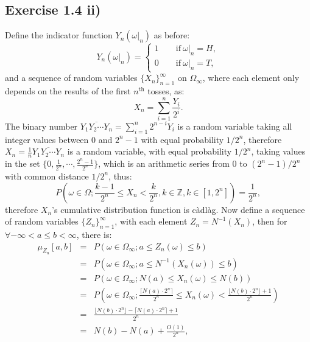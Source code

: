 \documentclass[final,3p,authoryear]{elsarticle}
\begin{document}
	\subsection{Exercise 1.4 ii)}
		Define the indicator function $Y_n(\omega|_n)$ as before:
		\begin{equation}
			Y_n(\omega|_n)=
			\begin{cases}
				1\qquad \mathrm{if~} \omega|_n=H,\\
				0\qquad \mathrm{if~} \omega|_n=T,
			\end{cases}
		\end{equation}
		and a sequence of random variables $\{X_n\}_{n=1}^{\infty}$ on $\Omega_\infty$, where each element only depends on the results of the first $n^\mathrm{th}$ tosses, as:
		\begin{equation}
			X_n=\sum\limits_{i=1}^{n} \frac{Y_i}{2^i}
			.
		\end{equation}
		The binary number $\overline{Y_1 Y_2 \cdots Y_n}=\sum\limits_{i=1}^{n} 2^{n-i} Y_i$ is a random variable taking all integer values between $0$ and $2^n-1$ with equal probability $1/2^n$, therefore $X_n=\frac{1}{n} \overline{Y_1 Y_2 \cdots Y_n}$ is a random variable, with equal probability $1/2^n$, taking values in the set $\{0, \frac{1}{2^n}, \cdots, \frac{2^n-1}{2^n}\}$, which is an arithmetic series from $0$ to $(2^n-1)/2^n$ with common distance $1/2^n$, thus:
		\begin{equation}
			P(\omega \in \Omega; \frac{k-1}{2^n} \leq X_n < \frac{k}{2^n}, k \in \mathbb{Z},k \in [1,2^n]) = \frac{1}{2^n}
			,
		\end{equation}
		therefore $X_n$'s cumulative distribution function is c\`adl\`ag.
		Now define a sequence of random variables $\{Z_n\}_{n=1}^{\infty}$, with each element $Z_n = N^{-1}(X_n)$, then for $\forall -\infty < a \leq b < \infty$, there is:
		\begin{eqnarray}
			\mu_{Z_n}[a,b]&=&P(\omega \in \Omega_\infty; a \leq Z_n(\omega) \leq b)
			\nonumber\\
			&=&P(\omega \in \Omega_\infty; a \leq N^{-1}(X_n(\omega)) \leq b)
			\nonumber\\
			&=&P(\omega \in \Omega_\infty; N(a) \leq X_n(\omega) \leq N(b))
			\nonumber\\
			&=&P(\omega \in \Omega_\infty; \frac{\lceil N(a)\cdot 2^n \rceil}{2^n} \leq X_n(\omega) < \frac{\lfloor N(b)\cdot 2^n \rfloor + 1}{2^n})
			\nonumber\\
			&=& \frac{\lfloor N(b)\cdot 2^n \rfloor - \lceil N(a)\cdot 2^n \rceil + 1}{2^n}
			\nonumber\\
			&=&N(b)-N(a) + \frac{O(1)}{2^n}
			,
		\end{eqnarray}
\end{document}
